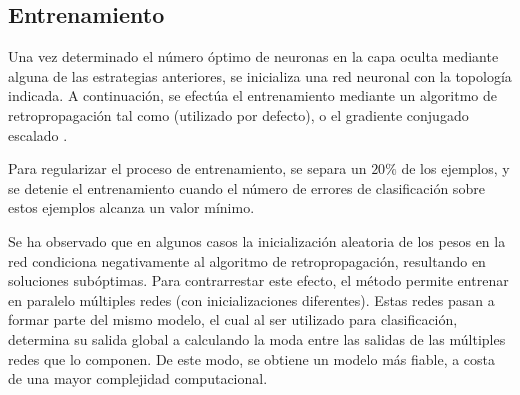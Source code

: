 %
\subsection{Entrenamiento}
%
Una vez determinado el número óptimo de neuronas en la capa oculta
mediante alguna de las estrategias anteriores, se inicializa una red
neuronal con la topología indicada.
A continuación, se efectúa el entrenamiento mediante un algoritmo de
retropropagación tal como  \cite{rprop} (utilizado por
defecto), o el gradiente conjugado escalado \cite{scg}.

Para regularizar el proceso de entrenamiento, se separa un $20\%$ de
los ejemplos, y se detenie el entrenamiento cuando el número de
errores de clasificación sobre estos ejemplos alcanza un valor mínimo.

Se ha observado que en algunos casos la inicialización aleatoria de
los pesos en la red condiciona negativamente al algoritmo de
retropropagación, resultando en soluciones subóptimas.
Para contrarrestar este efecto, el método permite entrenar en paralelo
múltiples redes (con inicializaciones diferentes).
Estas redes pasan a formar parte del mismo modelo, el cual al ser
utilizado para clasificación, determina su salida global a calculando
la moda entre las salidas de las múltiples redes que lo componen.
De este modo, se obtiene un modelo más fiable, a costa de una mayor
complejidad computacional.
